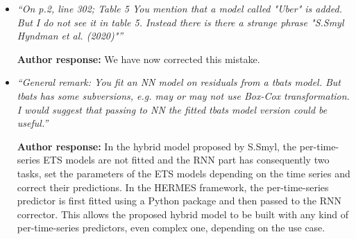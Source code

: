 \documentclass[11pt]{article}
\begin{document}
\begin{itemize}
\item {\em ``On p.2, line 302; Table 5 You mention that a model called "Uber" is added. But I do not see it in table 5. Instead there is there a strange phrase "S.Smyl Hyndman et al. (2020)"''} \medskip

\textbf{Author response:} We have now corrected this
mistake.

\item {\em ``General remark: You fit an NN model on residuals from a tbats model. But tbats has some subversions, e.g. may or may not use Box-Cox transformation. I would suggest that passing to NN the fitted tbats model version could be useful.''} \medskip

\textbf{Author response:} In the hybrid model proposed by S.Smyl, the per-time-series ETS models are not fitted and the RNN part has consequently two tasks, set the parameters of the ETS models depending on the time series and correct their predictions. In the HERMES framework, the per-time-series predictor is first fitted using a Python package and then passed to the RNN corrector. This allows the proposed hybrid model to be built with any kind of per-time-series predictors, even complex one, depending on the use case.
\end{itemize}
\end{document}
